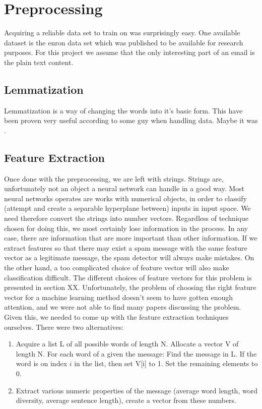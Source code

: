 
\section{Preprocessing}
Acquiring a reliable data set to train on was surprisingly easy. One available
dataset is the enron data set \cite{enron} which was published to be available
for research purposes. For this project we assume that the only interesting
part of an email is the plain text content.

\subsection{Lemmatization} Lemmatization is a way of changing the words into
it's basic form. This have been proven very useful according to some guy when
handling data. Maybe it was
\cite{tretyakov2004machine}.

\subsection{Feature Extraction}

Once done with the preprocessing, we are left with strings. Strings are,
unfortunately not an object a neural network can handle in a good way. 
Most neural networks operates are works with numerical objects, in order to
classify (attempt and create a separable hyperplane between)
inputs in input space. We need therefore convert the strings into number
vectors. Regardless of technique chosen for doing this, we most certainly lose
information in the process. In any case, there are information that are more
important than other information. If we extract features so that there may
exist a spam message with the same feature vector as a legitimate message, the
spam detector will always make mistakes. On the other hand, a too complicated
choice of feature vector will also make classification difficult. The different
choices of feature vectors for this problem is presented in section XX.
Unfortunately, the problem of choosing the right feature vector for a machine
learning method doesn't seem to have gotten enough attention, and we were not
able to find many papers discussing the problem. 
Given this, we needed to come up with the feature extraction techniques
ourselves. There were two alternatives:
\begin{enumerate}
  \item Acquire a list L of all possible words of length N. Allocate a vector V
    of length N. For each word of a given  the message: Find the message in L.
    If the word is on index $i$ in the list, then set V[i] to 1. Set the
    remaining elements to 0.
  \item Extract various numeric properties of the message (average word length,
    word diversity, average sentence length), create a vector from these
    numbers.
\end{enumerate}

